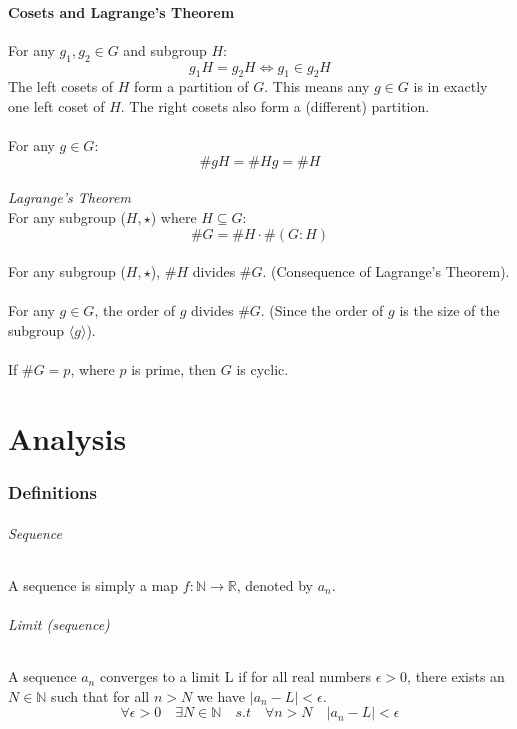 \documentclass{scrartcl}
\newcommand{\R}{\mathbb{R}}
\newcommand{\N}{\mathbb{N}}
\begin{document}
\subsection{Cosets and Lagrange's Theorem}
For any $ g_{1}, g_{2} \in G $ and subgroup $ H $:
\begin{equation}
g_{1}H = g_{2}H \Leftrightarrow g_{1} \in g_{2}H
\end{equation}
The left cosets of $ H $ form a partition of $ G $. This means any $ g \in G $ is in exactly one left coset of $ H $. The right cosets also form a (different) partition.
\\\\
For any $ g \in G $:
\begin{equation}
\#gH = \#Hg = \#H
\end{equation}
\\
\textit{Lagrange's Theorem}
\\
For any subgroup ($ H, \star $) where $ H \subseteq G $:
\begin{equation}
\#G = \#H \cdot \#(G : H)
\end{equation}
\\
For any subgroup ($ H, \star $), $ \#H $ divides $ \#G $. (Consequence of Lagrange's Theorem).
\\\\
For any $ g \in G $, the order of $ g $ divides $ \#G $. (Since the order of $ g $ is the size of the subgroup $ \langle g \rangle $).
\\\\
If $ \#G = p $, where $ p $ is prime, then $ G $ is cyclic.

\newpage
\part{Analysis}

\section{Definitions}

\paragraph{Sequence}
A sequence is simply a map $ f: \N \to \R $, denoted by $ a_{n} $.

\paragraph{Limit (sequence)}
A sequence $ a_{n} $ converges to a limit L if for all real numbers $ \epsilon > 0 $, there exists an $ N \in \N $ such that for all $ n > N $ we have $ |a_{n} - L| < \epsilon $.
\begin{equation}
\forall \epsilon > 0 \quad \exists N \in \N \quad s.t \quad \forall n > N \quad |a_{n} - L| < \epsilon
\end{equation}
\end{document}
